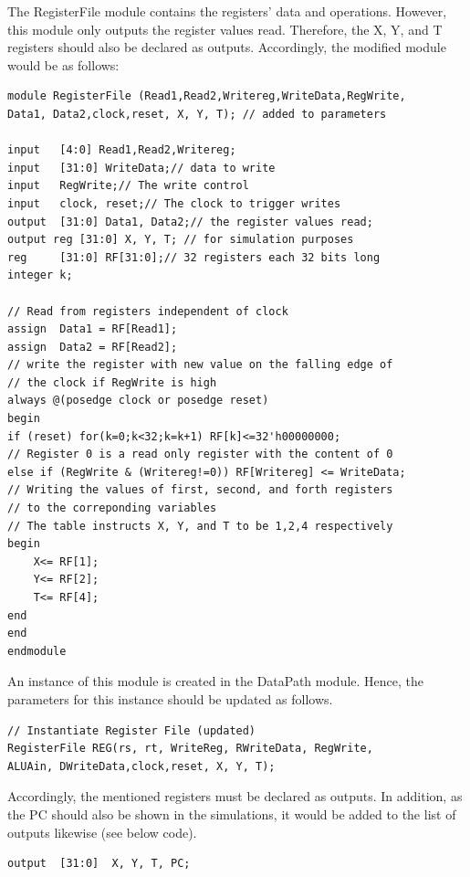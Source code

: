 \documentclass[12pt,a4paper]{article}
\begin{document}
	\noindent The RegisterFile module contains the registers' data and operations. However, this module only outputs the register values read. Therefore, the X, Y, and T registers should also be declared as outputs. Accordingly, the modified module would be as follows: 
	\begin{lstlisting}[style={verilog-style}]
module RegisterFile (Read1,Read2,Writereg,WriteData,RegWrite, 
Data1, Data2,clock,reset, X, Y, T); // added to parameters

input 	[4:0] Read1,Read2,Writereg;
input 	[31:0] WriteData;// data to write
input 	RegWrite;// The write control
input 	clock, reset;// The clock to trigger writes
output 	[31:0] Data1, Data2;// the register values read;
output reg [31:0] X, Y, T; // for simulation purposes
reg 	[31:0] RF[31:0];// 32 registers each 32 bits long
integer	k;

// Read from registers independent of clock	
assign 	Data1 = RF[Read1];
assign 	Data2 = RF[Read2]; 
// write the register with new value on the falling edge of 
// the clock if RegWrite is high
always @(posedge clock or posedge reset)
begin
if (reset) for(k=0;k<32;k=k+1) RF[k]<=32'h00000000;
// Register 0 is a read only register with the content of 0
else if (RegWrite & (Writereg!=0)) RF[Writereg] <= WriteData;
// Writing the values of first, second, and forth registers
// to the correponding variables
// The table instructs X, Y, and T to be 1,2,4 respectively
begin 
	X<= RF[1];
	Y<= RF[2];
	T<= RF[4];
end
end
endmodule
	\end{lstlisting}
	 
	 \noindent An instance of this module is created in the DataPath module. Hence, the parameters for this instance should be updated as follows. 
	
	\begin{lstlisting}[style={verilog-style}]
// Instantiate Register File (updated)
RegisterFile REG(rs, rt, WriteReg, RWriteData, RegWrite, 
ALUAin, DWriteData,clock,reset, X, Y, T);
	\end{lstlisting}
	
	\noindent Accordingly, the mentioned registers must be declared as outputs. In addition, as the PC should also be shown in the simulations, it would be added to the list of outputs likewise (see below code).
	
	\vspace{-0.3cm}
	\begin{lstlisting}[style={verilog-style}]
output	[31:0]	X, Y, T, PC;
	\end{lstlisting}
	
\end{document}
